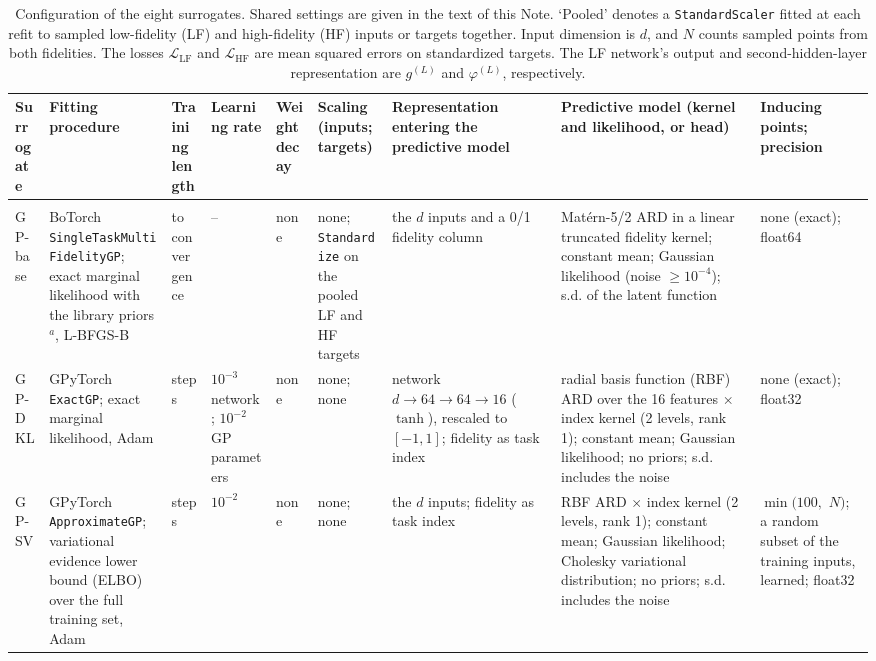 \begin{table}[p]
\caption{Configuration of the eight surrogates. Shared settings are given in the text of this Note. `Pooled' denotes a \texttt{StandardScaler} fitted at each refit to sampled low-fidelity (LF) and high-fidelity (HF) inputs or targets together. Input dimension is $d$, and $N$ counts sampled points from both fidelities. The losses $\mathcal{L}_{\mathrm{LF}}$ and $\mathcal{L}_{\mathrm{HF}}$ are mean squared errors on standardized targets. The LF network's output and second-hidden-layer representation are $g^{(L)}$ and $\varphi^{(L)}$, respectively.}
\label{supptab:surrogate_config}
{\fontsize{6.6bp}{7.4bp}\selectfont\setlength{\tabcolsep}{1.5pt}%
\begin{tabular}{@{}>{\raggedright\arraybackslash}p{1.45cm}>{\raggedright\arraybackslash}p{2.75cm}>{\raggedright\arraybackslash}p{1.15cm}>{\raggedright\arraybackslash}p{1.4cm}>{\raggedright\arraybackslash}p{0.85cm}>{\raggedright\arraybackslash}p{1.35cm}>{\raggedright\arraybackslash}p{1.9cm}>{\raggedright\arraybackslash}p{2.55cm}>{\raggedright\arraybackslash}p{1.45cm}@{}}
\toprule
Surrogate & Fitting procedure & Training length & Learning rate & Weight decay & Scaling (inputs; targets) & Representation entering the predictive model & Predictive model (kernel and likelihood, or head) & Inducing points; precision \\
\midrule
\multicolumn{9}{@{}l}{\emph{Gaussian-process (GP) family}} \\
GP-base & BoTorch \texttt{Single\-Task\-Multi\-Fidelity\-GP}; exact marginal likelihood with the library priors$^{a}$, L-BFGS-B & to convergence & -- & none & none; \texttt{Standard\-ize} on the pooled LF and HF targets & the $d$ inputs and a 0/1 fidelity column & Mat\'{e}rn-5/2 ARD in a linear truncated fidelity kernel; constant mean; Gaussian likelihood (noise $\ge 10^{-4}$); s.d. of the latent function & none (exact); float64 \\
GP-DKL & GPyTorch \texttt{ExactGP}; exact marginal likelihood, Adam & 500 steps & $10^{-3}$ network; $10^{-2}$ GP parameters & none & none; none & network $d \to 64 \to 64 \to 16$ ($\tanh$), rescaled to $[-1, 1]$; fidelity as task index & radial basis function (RBF) ARD over the 16 features $\times$ index kernel (2 levels, rank 1); constant mean; Gaussian likelihood; no priors; s.d. includes the noise & none (exact); float32 \\
GP-SV & GPyTorch \texttt{ApproximateGP}; variational evidence lower bound (ELBO) over the full training set, Adam & 500 steps & $10^{-2}$ & none & none; none & the $d$ inputs; fidelity as task index & RBF ARD $\times$ index kernel (2 levels, rank 1); constant mean; Gaussian likelihood; Cholesky variational distribution; no priors; s.d. includes the noise & $\min(100,$ $N)$; a random subset of the training inputs, learned; float32 \\

\end{tabular}}
\end{table}
